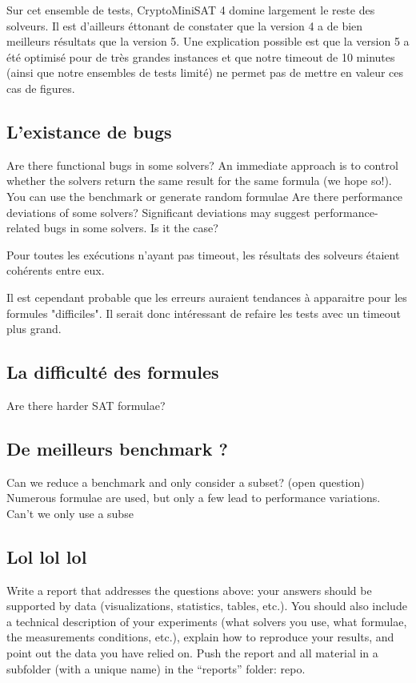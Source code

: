\documentclass[11pt,a4paper]{article}
\begin{document}
Sur cet ensemble de tests, CryptoMiniSAT 4 domine largement le reste des solveurs.
Il est d'ailleurs éttonant de constater que la version 4 a de bien meilleurs résultats que la version 5. Une explication possible est que la version 5 a été optimisé pour de très grandes instances et que notre timeout de 10 minutes (ainsi que notre ensembles de tests limité) ne permet pas de mettre en valeur ces cas de figures.

\subsection{L'existance de bugs}
 Are there functional bugs in some solvers?
 An immediate approach is to control whether the solvers return the same
result for the same formula (we hope so!). You can use the benchmark or
generate random formulae
 Are there performance deviations of some solvers?
 Significant deviations may suggest performance-related bugs in some
solvers. Is it the case?


Pour toutes les exécutions n'ayant pas timeout, les résultats des solveurs étaient cohérents entre eux.

Il est cependant probable que les erreurs auraient tendances à apparaitre pour les formules "difficiles". Il serait donc intéressant de refaire les tests avec un timeout plus grand. 

\subsection{La difficulté des formules}
 Are there harder SAT formulae?
 



\subsection{De meilleurs benchmark ?}
Can we reduce a benchmark and only consider a subset? (open question)
Numerous formulae are used, but only a few lead to performance variations.
Can’t we only use a subse

\subsection{Lol lol lol}
Write a report that addresses the questions above: your answers should be
supported by data (visualizations, statistics, tables, etc.). You should also include a
technical description of your experiments (what solvers you use, what formulae, the
measurements conditions, etc.), explain how to reproduce your results, and point out
the data you have relied on. Push the report and all material in a subfolder (with a
unique name) in the “reports” folder:
repo.
\end{document}
